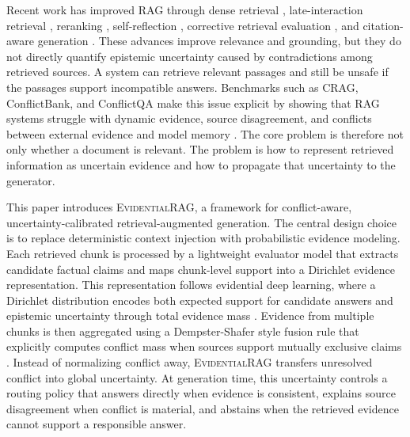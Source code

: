 \documentclass[preprint,12pt,authoryear,nopreprintline]{elsarticle}
\newcommand{\ERAG}{\textsc{EvidentialRAG}}
\begin{document}
Recent work has improved RAG through dense retrieval \citep{Karpukhin2020DPR}, late-interaction retrieval \citep{Khattab2020ColBERT,Santhanam2022ColBERTv2}, reranking \citep{Nogueira2019MonoBERT,Reimers2019SBERT}, self-reflection \citep{Asai2024SelfRAG}, corrective retrieval evaluation \citep{Yan2024CRAG}, and citation-aware generation \citep{Gao2023ALCE}. These advances improve relevance and grounding, but they do not directly quantify epistemic uncertainty caused by contradictions among retrieved sources. A system can retrieve relevant passages and still be unsafe if the passages support incompatible answers. Benchmarks such as CRAG, ConflictBank, and ConflictQA make this issue explicit by showing that RAG systems struggle with dynamic evidence, source disagreement, and conflicts between external evidence and model memory \citep{Yang2024CRAGBenchmark,Su2024ConflictBank,Xie2024ConflictQA}. The core problem is therefore not only whether a document is relevant. The problem is how to represent retrieved information as uncertain evidence and how to propagate that uncertainty to the generator.

This paper introduces \ERAG{}, a framework for conflict-aware, uncertainty-calibrated retrieval-augmented generation. The central design choice is to replace deterministic context injection with probabilistic evidence modeling. Each retrieved chunk is processed by a lightweight evaluator model that extracts candidate factual claims and maps chunk-level support into a Dirichlet evidence representation. This representation follows evidential deep learning, where a Dirichlet distribution encodes both expected support for candidate answers and epistemic uncertainty through total evidence mass \citep{Sensoy2018EDL}. Evidence from multiple chunks is then aggregated using a Dempster-Shafer style fusion rule that explicitly computes conflict mass when sources support mutually exclusive claims \citep{Dempster1967,Shafer1976}. Instead of normalizing conflict away, \ERAG{} transfers unresolved conflict into global uncertainty. At generation time, this uncertainty controls a routing policy that answers directly when evidence is consistent, explains source disagreement when conflict is material, and abstains when the retrieved evidence cannot support a responsible answer.
\end{document}
